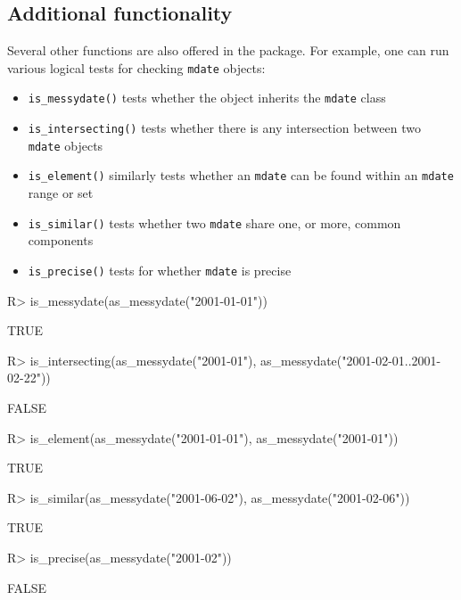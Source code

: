 \documentclass[
]{jss}
\providecommand{\tightlist}{%
  \setlength{\itemsep}{0pt}\setlength{\parskip}{0pt}}
\begin{document}
\hypertarget{additional-functionality}{%
\subsection{Additional functionality}\label{additional-functionality}}

Several other functions are also offered in the 
package. For example, one can run various logical tests for checking
\texttt{mdate} objects:

\begin{itemize}
\tightlist
\item
  \texttt{is\_messydate()} tests whether the object inherits the
  \texttt{mdate} class
\item
  \texttt{is\_intersecting()} tests whether there is any intersection
  between two \texttt{mdate} objects
\item
  \texttt{is\_element()} similarly tests whether an \texttt{mdate} can
  be found within an \texttt{mdate} range or set
\item
  \texttt{is\_similar()} tests whether two \texttt{mdate} share one, or
  more, common components
\item
  \texttt{is\_precise()} tests for whether \texttt{mdate} is precise
\end{itemize}

\begin{CodeChunk}
\begin{CodeInput}
R> is_messydate(as_messydate("2001-01-01"))
\end{CodeInput}
\begin{CodeOutput}
[1] TRUE
\end{CodeOutput}
\begin{CodeInput}
R> is_intersecting(as_messydate("2001-01"), as_messydate("2001-02-01..2001-02-22"))
\end{CodeInput}
\begin{CodeOutput}
[1] FALSE
\end{CodeOutput}
\begin{CodeInput}
R> is_element(as_messydate("2001-01-01"), as_messydate("2001-01"))
\end{CodeInput}
\begin{CodeOutput}
[1] TRUE
\end{CodeOutput}
\begin{CodeInput}
R> is_similar(as_messydate("2001-06-02"), as_messydate("2001-02-06"))
\end{CodeInput}
\begin{CodeOutput}
[1] TRUE
\end{CodeOutput}
\begin{CodeInput}
R> is_precise(as_messydate("2001-02"))
\end{CodeInput}
\begin{CodeOutput}
[1] FALSE
\end{CodeOutput}
\end{CodeChunk}
\end{document}
